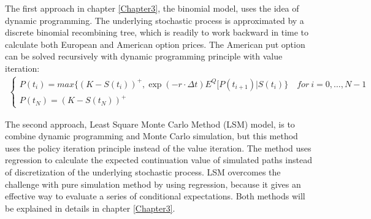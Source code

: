 The first approach in chapter \ref{Chapter3}, the binomial model, uses the idea of dynamic programming. The underlying stochastic process is approximated by a discrete binomial recombining tree, which is readily to work backward in time to calculate both European and American option prices. The American put option can be solved recursively with dynamic programming principle with value iteration: 
\begin{equation}\label{BellmanEq}
\begin{split}
\begin{cases}
          P(t_i) = max\{ (K-S(t_i))^+, \exp(-r\cdot \Delta t) E^Q[P(t_{i+1})|S(t_i)\} \quad for \ i={0,\ldots,N-1} \\
          P(t_N) = (K-S(t_N))^+ 
\end{cases}
\end{split}
\end{equation}

The second approach, Least Square Monte Carlo Method (LSM) model, is to combine dynamic programming and Monte Carlo simulation, but this method uses the policy iteration principle instead of the value iteration. The method uses regression to calculate the expected continuation value of simulated paths instead of discretization of the underlying stochastic process. LSM overcomes the challenge with pure simulation method by using regression, because it gives an effective way to evaluate a series of conditional expectations. Both methods will be explained in details in chapter \ref{Chapter3}.





